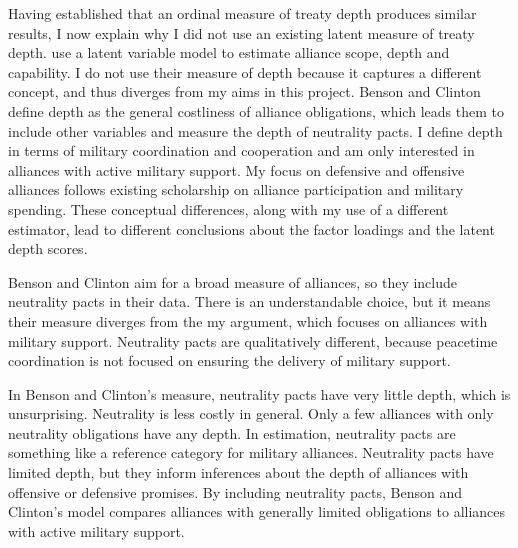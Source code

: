 \documentclass[12pt]{article}
\begin{document}
Having established that an ordinal measure of treaty depth produces similar results, I now explain why I did not use an existing latent measure of treaty depth. 
\citet{BensonClinton2016} use a latent variable model to estimate alliance scope, depth and capability. 
I do not use their measure of depth because it captures a different concept, and thus diverges from my aims in this project. 
Benson and Clinton define depth as the general costliness of alliance obligations, which leads them to include other variables and measure the depth of neutrality pacts. 
I define depth in terms of military coordination and cooperation and am only interested in alliances with active military support. 
My focus on defensive and offensive alliances follows existing scholarship on alliance participation and military spending.
These conceptual differences, along with my use of a different estimator, lead to different conclusions about the factor loadings and the latent depth scores.


Benson and Clinton aim for a broad measure of alliances, so they include neutrality pacts in their data. 
There is an understandable choice, but it means their measure diverges from the my argument, which focuses on alliances with military support. 
Neutrality pacts are qualitatively different, because peacetime coordination is not focused on ensuring the delivery of military support. 



In Benson and Clinton's measure, neutrality pacts have very little depth, which is unsurprising.
Neutrality is less costly in general.  
Only a few alliances with only neutrality obligations have any depth. %
%
%
In estimation, neutrality pacts are something like a reference category for military alliances. 
Neutrality pacts have limited depth, but they inform inferences about the depth of alliances with offensive or defensive promises. 
By including neutrality pacts, Benson and Clinton's model compares alliances with generally limited obligations to alliances with active military support.
\end{document}
